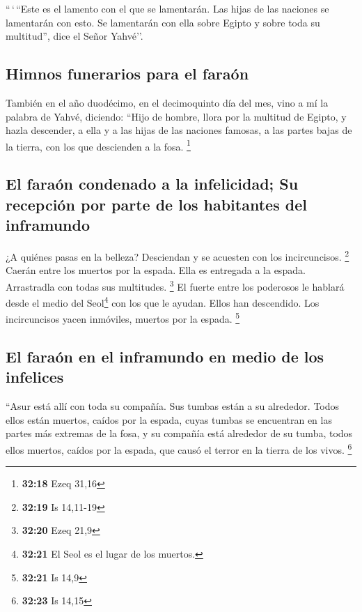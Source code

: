  ``\,`\,``Este es el lamento con el que se lamentarán.
Las hijas de las naciones se lamentarán con esto. Se lamentarán con ella
sobre Egipto y sobre toda su multitud'', dice el Señor Yahvé''.

\hypertarget{himnos-funerarios-para-el-farauxf3n}{%
\subsection{Himnos funerarios para el
faraón}\label{himnos-funerarios-para-el-farauxf3n}}

 También en el año duodécimo, en el decimoquinto día del
mes, vino a mí la palabra de Yahvé, diciendo:  ``Hijo de
hombre, llora por la multitud de Egipto, y hazla descender, a ella y a
las hijas de las naciones famosas, a las partes bajas de la tierra, con
los que descienden a la fosa. \footnote{\textbf{32:18} Ezeq 31,16}

\hypertarget{el-farauxf3n-condenado-a-la-infelicidad-su-recepciuxf3n-por-parte-de-los-habitantes-del-inframundo}{%
\subsection{El faraón condenado a la infelicidad; Su recepción por parte
de los habitantes del
inframundo}\label{el-farauxf3n-condenado-a-la-infelicidad-su-recepciuxf3n-por-parte-de-los-habitantes-del-inframundo}}

 ¿A quiénes pasas en la belleza? Desciendan y se acuesten
con los incircuncisos. \footnote{\textbf{32:19} Is 14,11-19}
 Caerán entre los muertos por la espada. Ella es
entregada a la espada. Arrastradla con todas sus multitudes. \footnote{\textbf{32:20}
  Ezeq 21,9}  El fuerte entre los poderosos le hablará
desde el medio del Seol\footnote{\textbf{32:21} El Seol es el lugar de
  los muertos.} con los que le ayudan. Ellos han descendido. Los
incircuncisos yacen inmóviles, muertos por la espada. \footnote{\textbf{32:21}
  Is 14,9}

\hypertarget{el-farauxf3n-en-el-inframundo-en-medio-de-los-infelices}{%
\subsection{El faraón en el inframundo en medio de los
infelices}\label{el-farauxf3n-en-el-inframundo-en-medio-de-los-infelices}}

 ``Asur está allí con toda su compañía. Sus tumbas están
a su alrededor. Todos ellos están muertos, caídos por la espada,
 cuyas tumbas se encuentran en las partes más extremas de
la fosa, y su compañía está alrededor de su tumba, todos ellos muertos,
caídos por la espada, que causó el terror en la tierra de los vivos.
\footnote{\textbf{32:23} Is 14,15}

